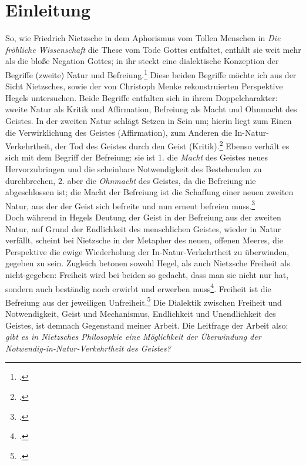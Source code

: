 \documentclass[12pt, a4paper, openany]{report}
\begin{document}
\onehalfspacing
\tableofcontents

\mainmatter

\chapter{Einleitung}
So, wie Friedrich Nietzsche in dem Aphorismus vom \glqq Tollen Menschen\grqq{} in \textit{Die fröhliche Wissenschaft} die These vom Tode Gottes entfaltet, enthält sie weit mehr als die bloße Negation Gottes;
in ihr steckt eine dialektische Konzeption der Begriffe (zweite) Natur und Befreiung.\footcite[Vgl.][481]{nietzsche_morgenrote_1999}
Diese beiden Begriffe möchte ich aus der Sicht Nietzsches, sowie der von Christoph Menke rekonstruierten Perspektive Hegels untersuchen.
Beide Begriffe entfalten sich in ihrem Doppelcharakter: zweite Natur als Kritik und Affirmation, Befreiung als Macht und Ohnmacht des Geistes.
In der zweiten Natur schlägt Setzen in Sein um; hierin liegt zum Einen die Verwirklichung des Geistes (Affirmation), zum Anderen die In-Natur-Verkehrtheit, der Tod des Geistes durch den Geist (Kritik).\footcite[Vgl.][145]{menke_autonomie_2018}
Ebenso verhält es sich mit dem Begriff der Befreiung: 
sie ist 1. die \textit{Macht} des Geistes neues Hervorzubringen und die scheinbare Notwendigkeit des Bestehenden zu durchbrechen, 
2. aber die \textit{Ohnmacht} des Geistes, da die Befreiung nie abgeschlossen ist; die Macht der Befreiung ist die Schaffung einer \glqq neuen\grqq{} zweiten Natur, aus der der Geist sich befreite und nun erneut befreien muss.\footcite[Vgl.][80]{menke_autonomie_2018}\\
Doch während in Hegels Deutung der Geist in der Befreiung aus der zweiten Natur, auf Grund der Endlichkeit des menschlichen Geistes, wieder in Natur verfällt, scheint bei Nietzsche in der Metapher des neuen, offenen Meeres, die Perspektive die ewige Wiederholung der In-Natur-Verkehrtheit zu überwinden, gegeben zu sein.
Zugleich betonen sowohl Hegel, als auch Nietzsche Freiheit als nicht-gegeben: 
Freiheit wird bei beiden so gedacht, dass man sie \glqq nicht nur hat, sondern auch beständig  noch erwirbt und erwerben muss\grqq\footcite[][637]{nietzsche_morgenrote_1999}. 
Freiheit ist die Befreiung aus der jeweiligen Unfreiheit.\footcite[Vgl][227]{adorno_negative_dialektik_2003}
Die Dialektik zwischen Freiheit und Notwendigkeit, Geist und Mechanismus, Endlichkeit und Unendlichkeit des Geistes, ist demnach Gegenstand meiner Arbeit. 
Die Leitfrage der Arbeit also: \textit{gibt es in Nietzsches Philosophie eine Möglichkeit der Überwindung der Notwendig-in-Natur-Verkehrtheit des Geistes?}\\
\end{document}
